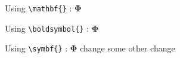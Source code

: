 \documentclass{article}
\begin{document}
Using \verb|\mathbf{}| : \(\mathbf{\Phi}\)

Using \verb|\boldsymbol{}| : \(\boldsymbol{\Phi}\)

Using \verb|\symbf{}| : \( \symbf{\Phi}\)
change  some other change

\end{document}
